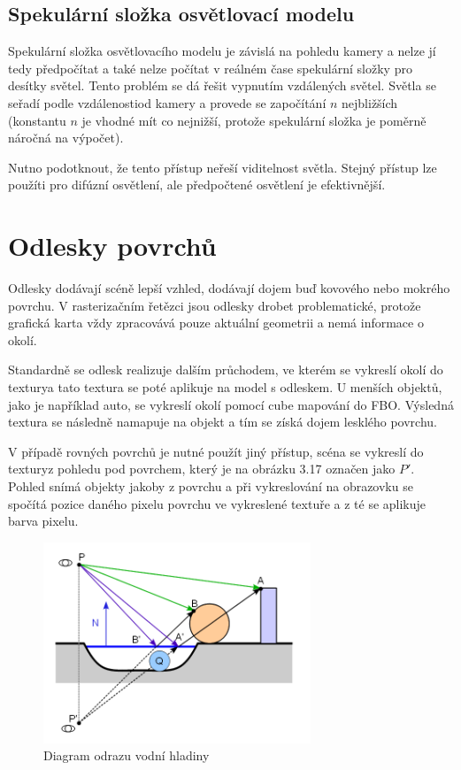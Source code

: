 \documentclass[11pt,twoside,a4paper]{book}
\begin{document}
\subsection{Spekulární složka osvětlovací modelu}
Spekulární složka osvětlovacího modelu je závislá na pohledu kamery a nelze jí tedy předpočítat a také nelze počítat v reálném čase spekulární složky pro desítky světel. Tento problém se dá řešit vypnutím vzdálených světel. Světla se seřadí podle vzdálenosti\linebreak od kamery a provede se započítání $n$ nejbližších (konstantu $n$ je vhodné mít co nejnižší, protože spekulární složka je poměrně náročná na výpočet). 

Nutno podotknout, že tento přístup neřeší viditelnost světla. Stejný přístup lze použít\linebreak i pro difúzní osvětlení, ale předpočtené osvětlení je efektivnější.

\section{Odlesky povrchů}
Odlesky dodávají scéně lepší vzhled, dodávají dojem buď kovového nebo mokrého povrchu. V rasterizačním řetězci jsou odlesky drobet problematické, protože grafická karta vždy zpracovává pouze aktuální geometrii a nemá informace o okolí.

Standardně se odlesk realizuje dalším průchodem, ve kterém se vykreslí okolí do textury\linebreak a tato textura se poté aplikuje na model s odleskem. U menších objektů, jako je například auto, se vykreslí okolí pomocí cube mapování do FBO. Výsledná textura se následně namapuje na objekt a tím se získá dojem lesklého povrchu.
\newpage

V případě rovných povrchů je nutné použít jiný přístup, scéna se vykreslí do textury\linebreak z pohledu pod povrchem, který je na obrázku 3.17 označen jako $P'$. Pohled snímá objekty jakoby z povrchu a při vykreslování na obrazovku se spočítá pozice daného pixelu povrchu ve vykreslené textuře a z té se aplikuje barva pixelu.

\begin{figure}[h!]
\begin{center}
\includegraphics[width=80mm]{figures/reflection-diagram.png}
\caption{Diagram odrazu vodní hladiny \cite{Kaplinski11}}
\end{center}
\end{figure}
\end{document}

